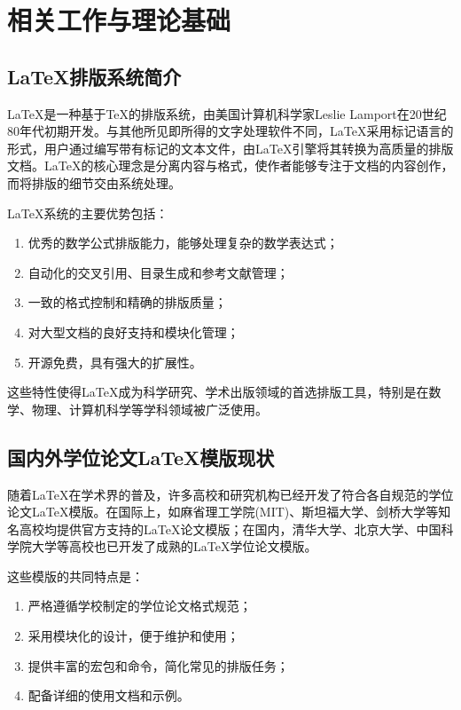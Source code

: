 \section{相关工作与理论基础}

\subsection{LaTeX排版系统简介}
\LaTeX{}是一种基于TeX的排版系统，由美国计算机科学家Leslie Lamport在20世纪80年代初期开发。与其他所见即所得的文字处理软件不同，\LaTeX{}采用标记语言的形式，用户通过编写带有标记的文本文件，由\LaTeX{}引擎将其转换为高质量的排版文档\cite{kopka2003guide}。\LaTeX{}的核心理念是分离内容与格式，使作者能够专注于文档的内容创作，而将排版的细节交由系统处理。

\LaTeX{}系统的主要优势包括：

\begin{enumerate}
    \item 优秀的数学公式排版能力，能够处理复杂的数学表达式；
    \item 自动化的交叉引用、目录生成和参考文献管理；
    \item 一致的格式控制和精确的排版质量；
    \item 对大型文档的良好支持和模块化管理；
    \item 开源免费，具有强大的扩展性。
\end{enumerate}

这些特性使得\LaTeX{}成为科学研究、学术出版领域的首选排版工具，特别是在数学、物理、计算机科学等学科领域被广泛使用。

\subsection{国内外学位论文LaTeX模版现状}
随着\LaTeX{}在学术界的普及，许多高校和研究机构已经开发了符合各自规范的学位论文\LaTeX{}模版。在国际上，如麻省理工学院(MIT)、斯坦福大学、剑桥大学等知名高校均提供官方支持的\LaTeX{}论文模版；在国内，清华大学、北京大学、中国科学院大学等高校也已开发了成熟的\LaTeX{}学位论文模版。

这些模版的共同特点是：
\begin{enumerate}
    \item 严格遵循学校制定的学位论文格式规范；
    \item 采用模块化的设计，便于维护和使用；
    \item 提供丰富的宏包和命令，简化常见的排版任务；
    \item 配备详细的使用文档和示例。
\end{enumerate}

